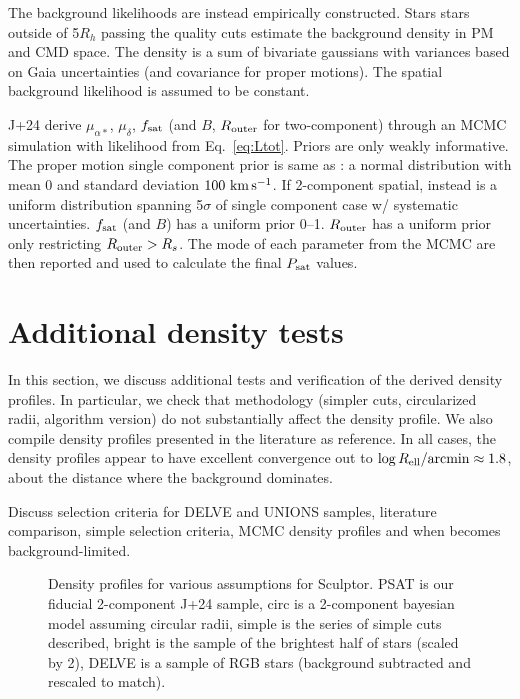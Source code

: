 The background likelihoods are instead empirically constructed. Stars
stars outside of 5\(R_h\) passing the quality cuts estimate the
background density in PM and CMD space. The density is a sum of
bivariate gaussians with variances based on Gaia uncertainties (and
covariance for proper motions). The spatial background likelihood is
assumed to be constant.

J+24 derive \(\mu_{\alpha*}\), \(\mu_\delta\), \(f_{\rm sat}\) (and
\(B\), \(R_{\rm outer}\) for two-component) through an MCMC simulation
with likelihood from Eq.~\ref{eq:Ltot}. Priors are only weakly
informative. The proper motion single component prior is same as
\citet{MV2020a}: a normal distribution with mean 0 and standard
deviation \(100\ {\rm km\,s^{-1}}\). If 2-component spatial, instead is a uniform
distribution spanning 5\(\sigma\) of single component case w/ systematic
uncertainties. \(f_{\rm sat}\) (and \(B\)) has a uniform prior 0--1.
\(R_{\rm outer}\) has a uniform prior only restricting
\(R_{\rm outer} > R_s\). The mode of each parameter from the MCMC are
then reported and used to calculate the final \(P_{\rm sat}\) values.

\section{Additional density tests}\label{additional-density-tests}

In this section, we discuss additional tests and verification of the
derived density profiles. In particular, we check that methodology
(simpler cuts, circularized radii, algorithm version) do not
substantially affect the density profile. We also compile density
profiles presented in the literature as reference. In all cases, the
density profiles appear to have excellent convergence out to
\(\log R_{\rm ell} / {\rm arcmin} \approx 1.8\), about the distance
where the background dominates.

Discuss selection criteria for DELVE and UNIONS samples, literature
comparison, simple selection criteria, MCMC density profiles and when
\citet{jensen+2024} becomes background-limited.

\begin{figure}
\centering
{}
\caption[Scl density comparison]{Density profiles for various
assumptions for Sculptor. PSAT is our fiducial 2-component J+24 sample,
circ is a 2-component bayesian model assuming circular radii, simple is
the series of simple cuts described, bright is the sample of the
brightest half of stars (scaled by 2), DELVE is a sample of RGB stars
(background subtracted and rescaled to
match).}\label{fig:scl_density_extras}
\end{figure}

